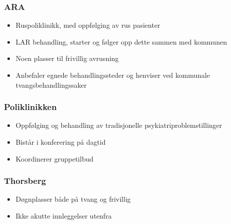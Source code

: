 \documentclass[11pt]{report} %
\begin{document}
                        \subsubsection{ARA}\label{sec:org_ddps_ARA}
                          \begin{itemize}
                            \item Ruspoliklinikk, med oppfølging av rus pasienter\\
                            \item LAR behandling, starter og følger opp dette sammen med kommunen\\
                            \item Noen plasser til frivillig avrusning\\
                            \item Anbefaler egnede behandlingssteder og henviser ved kommunale tvangsbehandlingssaker\\
                          \end{itemize}
                        \subsubsection{Poliklinikken}\label{sec:org_ddps_poli}
                          \begin{itemize}
                            \item Oppfølging og behandling av tradisjonelle psykiatriproblemstillinger\\
                            \item Bistår i konferering på dagtid\\
                            \item Koordinerer gruppetilbud\\
                          \end{itemize}
                        \subsubsection{Thorsberg}\label{sec:org_ddps_thorsberg}
                          \begin{itemize}
                            \item Døgnplasser både på tvang og frivillig\\
                            \item Ikke akutte innleggelser utenfra\\
                            \end{itemize}
\end{document}
